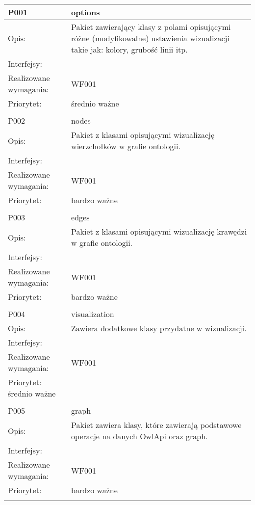 \documentclass[a4paper,10pt]{article}
\begin{document}
\begin{center}
\begin{longtable}{|m{3cm}|m{9cm}|} \hline

P001 & options\\ \hline
Opis: & Pakiet zawierający klasy z polami opisującymi różne (modyfikowalne) ustawienia wizualizacji takie jak: kolory, grubość linii itp.     \\ \hline
Interfejsy: &     \\ \hline
Realizowane wymagania: & WF001 \\ \hline
Priorytet: & średnio ważne \\ \hline

\multicolumn{2}{c}{} \\
 \hline

P002 & nodes\\ \hline
Opis: & Pakiet z klasami opisującymi wizualizację wierzchołków w grafie ontologii.    \\ \hline
Interfejsy: &     \\ \hline
Realizowane wymagania: & WF001 \\ \hline
Priorytet: & bardzo ważne \\ \hline

\multicolumn{2}{c}{} \\
 \hline

P003 & edges\\ \hline
Opis: & Pakiet z klasami opisującymi wizualizację krawędzi w grafie ontologii.    \\ \hline
Interfejsy: &     \\ \hline
Realizowane wymagania: & WF001 \\ \hline
Priorytet: & bardzo ważne \\ \hline

\multicolumn{2}{c}{} \\
 \hline

P004 & visualization\\ \hline
Opis: & Zawiera dodatkowe klasy przydatne w wizualizacji.\\ \hline
Interfejsy: &     \\ \hline
Realizowane wymagania: & WF001 \\ \hline
Priorytet: średnio ważne&  \\ \hline

\multicolumn{2}{c}{} \\
 \hline

P005 & graph\\ \hline
Opis: & Pakiet zawiera klasy, które zawierają podstawowe operacje na danych OwlApi oraz graph. \\ \hline
Interfejsy: &     \\ \hline
Realizowane wymagania: & WF001 \\ \hline
Priorytet: & bardzo ważne \\ \hline

\multicolumn{2}{c}{} \\
 \hline

\end{longtable}

\end{center}
\end{document}
